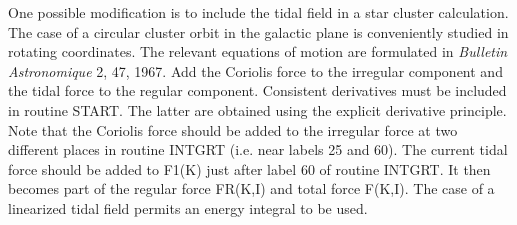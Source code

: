  One possible modification is to include the tidal field in a star cluster
 calculation.  The case of a circular cluster orbit in the galactic plane is
 conveniently
              studied in rotating coordinates.  The relevant equations of motion
 are formulated in {\it Bulletin Astronomique} 2, 47, 1967.  Add the Coriolis
 force
 to the irregular component and the tidal force to the regular
 component.  Consistent derivatives must be included in routine START.  The
 latter are obtained using the explicit derivative principle.  Note that the
 Coriolis force should be added to the irregular force at two different places
 in routine INTGRT (i.e. near labels 25 and 60).  The current tidal
 force should be added to F1(K) just after label 60 of routine INTGRT.  It
 then becomes part of the regular force FR(K,I) and total force F(K,I).  The
 case of a linearized tidal field permits an energy integral to be used.
\bye

